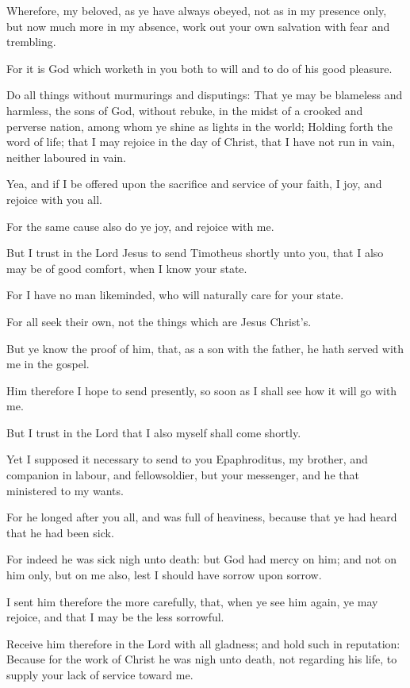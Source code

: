 \verse Wherefore, my beloved, as ye have always obeyed, not as in my presence only, but now much more in my absence, work out your own salvation with fear and trembling.

\verse For it is God which worketh in you both to will and to do of his good pleasure.

\verse Do all things without murmurings and disputings: \verse That ye may be blameless and harmless, the sons of God, without rebuke, in the midst of a crooked and perverse nation, among whom ye shine as lights in the world; \verse Holding forth the word of life; that I may rejoice in the day of Christ, that I have not run in vain, neither laboured in vain.

\verse Yea, and if I be offered upon the sacrifice and service of your faith, I joy, and rejoice with you all.

\verse For the same cause also do ye joy, and rejoice with me.

\verse But I trust in the Lord Jesus to send Timotheus shortly unto you, that I also may be of good comfort, when I know your state.

\verse For I have no man likeminded, who will naturally care for your state.

\verse For all seek their own, not the things which are Jesus Christ's.

\verse But ye know the proof of him, that, as a son with the father, he hath served with me in the gospel.

\verse Him therefore I hope to send presently, so soon as I shall see how it will go with me.

\verse But I trust in the Lord that I also myself shall come shortly.

\verse Yet I supposed it necessary to send to you Epaphroditus, my brother, and companion in labour, and fellowsoldier, but your messenger, and he that ministered to my wants.

\verse For he longed after you all, and was full of heaviness, because that ye had heard that he had been sick.

\verse For indeed he was sick nigh unto death: but God had mercy on him; and not on him only, but on me also, lest I should have sorrow upon sorrow.

\verse I sent him therefore the more carefully, that, when ye see him again, ye may rejoice, and that I may be the less sorrowful.

\verse Receive him therefore in the Lord with all gladness; and hold such in reputation: \verse Because for the work of Christ he was nigh unto death, not regarding his life, to supply your lack of service toward me.


